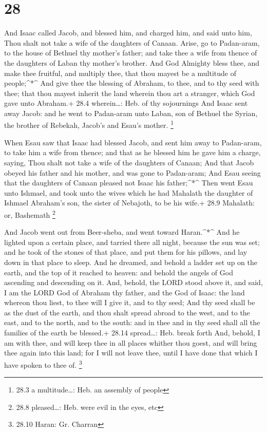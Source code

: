 \hypertarget{section-27}{%
\section{28}\label{section-27}}

 And Isaac called Jacob, and blessed him, and charged him,
and said unto him, Thou shalt not take a wife of the daughters of
Canaan.  Arise, go to Padan-aram, to the house of Bethuel
thy mother's father; and take thee a wife from thence of the daughters
of Laban thy mother's brother.  And God Almighty bless thee,
and make thee fruitful, and multiply thee, that thou mayest be a
multitude of people;\^{}*\^{}  And give thee the blessing of
Abraham, to thee, and to thy seed with thee; that thou mayest inherit
the land wherein thou art a stranger, which God gave unto Abraham.+ 28.4
wherein\ldots: Heb. of thy sojournings  And Isaac sent away
Jacob: and he went to Padan-aram unto Laban, son of Bethuel the Syrian,
the brother of Rebekah, Jacob's and Esau's mother. \footnote{28.3 a
  multitude\ldots: Heb. an assembly of people}

 When Esau saw that Isaac had blessed Jacob, and sent him
away to Padan-aram, to take him a wife from thence; and that as he
blessed him he gave him a charge, saying, Thou shalt not take a wife of
the daughters of Canaan;  And that Jacob obeyed his father
and his mother, and was gone to Padan-aram;  And Esau seeing
that the daughters of Canaan pleased not Isaac his father;\^{}*\^{}
 Then went Esau unto Ishmael, and took unto the wives which
he had Mahalath the daughter of Ishmael Abraham's son, the sister of
Nebajoth, to be his wife.+ 28.9 Mahalath: or, Bashemath \footnote{28.8
  pleased\ldots: Heb. were evil in the eyes, etc}

 And Jacob went out from Beer-sheba, and went toward
Haran.\^{}*\^{}  And he lighted upon a certain place, and
tarried there all night, because the sun was set; and he took of the
stones of that place, and put them for his pillows, and lay down in that
place to sleep.  And he dreamed, and behold a ladder set up
on the earth, and the top of it reached to heaven: and behold the angels
of God ascending and descending on it.  And, behold, the
LORD stood above it, and said, I am the LORD God of Abraham thy father,
and the God of Isaac: the land whereon thou liest, to thee will I give
it, and to thy seed;  And thy seed shall be as the dust of
the earth, and thou shalt spread abroad to the west, and to the east,
and to the north, and to the south: and in thee and in thy seed shall
all the families of the earth be blessed.+ 28.14 spread\ldots: Heb.
break forth  And, behold, I am with thee, and will keep
thee in all places whither thou goest, and will bring thee again into
this land; for I will not leave thee, until I have done that which I
have spoken to thee of. \footnote{28.10 Haran: Gr. Charran}

